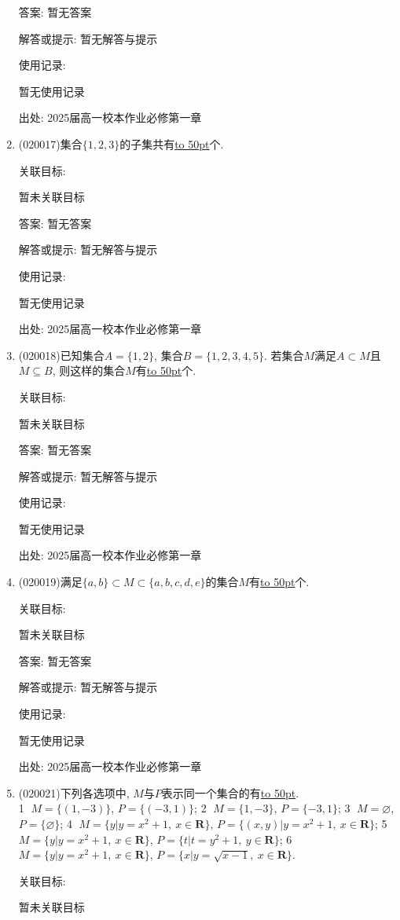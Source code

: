 \documentclass[10pt,a4paper]{article}
\newcommand{\blank}[1]{\underline{\hbox to #1pt{}}}
\begin{document}
\begin{enumerate}[1.]
答案: 暂无答案

解答或提示: 暂无解答与提示

使用记录:

暂无使用记录


出处: 2025届高一校本作业必修第一章
\item { (020017)}集合$\{1,2,3\}$的子集共有\blank{50}个.


关联目标:

暂未关联目标

答案: 暂无答案

解答或提示: 暂无解答与提示

使用记录:

暂无使用记录


出处: 2025届高一校本作业必修第一章
\item { (020018)}已知集合$A=\{1,2\}$, 集合$B=\{1,2,3,4,5\}$. 若集合$M$满足$A\subset M$且$M\subseteq B$, 则这样的集合$M$有\blank{50}个.


关联目标:

暂未关联目标

答案: 暂无答案

解答或提示: 暂无解答与提示

使用记录:

暂无使用记录


出处: 2025届高一校本作业必修第一章
\item { (020019)}满足$\{a, b\}\subset M \subset\{a, b, c, d, e\}$的集合$M$有\blank{50}个.


关联目标:

暂未关联目标

答案: 暂无答案

解答或提示: 暂无解答与提示

使用记录:

暂无使用记录


出处: 2025届高一校本作业必修第一章
\item { (020021)}下列各选项中, $M$与$P$表示同一个集合的有\blank{50}.\\
\textcircled{1} $M=\{(1, -3)\}$, $P=\{(-3, 1)\}$; \textcircled{2} $M=\{1, -3\}$, $P=\{-3, 1\}$; \textcircled{3} $M=\varnothing$, $P=\{\varnothing\}$; \textcircled{4} $M=\{y|y=x^2+1, \  x\in\mathbf{R}\}$, $P=\{(x, y)|y=x^2+1, \ x\in\mathbf{R}\}$; \textcircled{5} $M=\{y|y=x^2+1, \  x\in\mathbf{R}\}$, $P=\{t|t=y^2+1, \ y\in\mathbf{R}\}$; \textcircled{6} $M=\{y|y=x^2+1, \  x\in\mathbf{R}\}$, $P=\{x|y=\sqrt{x-1},\  x\in\mathbf{R}\}$.


关联目标:

暂未关联目标


\end{enumerate}
\end{document}

